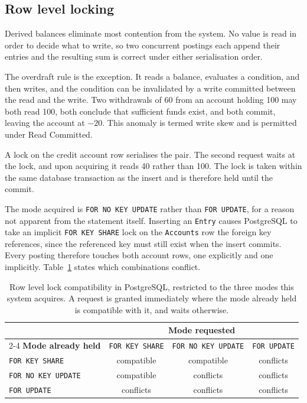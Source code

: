 \documentclass[11pt,a4paper]{article}
\newcommand{\code}[1]{\texttt{\fontsize{8.6}{10}\selectfont #1}}
\begin{document}
\subsection{Row level locking}\label{sec:lock}

Derived balances eliminate most contention from the system. No value is read in
order to decide what to write, so two concurrent postings each append their
entries and the resulting sum is correct under either serialisation order.

The overdraft rule is the exception. It reads a balance, evaluates a condition,
and then writes, and the condition can be invalidated by a write committed
between the read and the write. Two withdrawals of 60 from an account holding
100 may both read 100, both conclude that sufficient funds exist, and both
commit, leaving the account at $-20$. This anomaly is termed write skew and is
permitted under Read Committed.

A lock on the credit account row serialises the pair. The second request waits
at the lock, and upon acquiring it reads 40 rather than 100. The lock is taken
within the same database transaction as the insert and is therefore held until
the commit.

The mode acquired is \code{FOR NO KEY UPDATE} rather than \code{FOR UPDATE}, for
a reason not apparent from the statement itself. Inserting an \code{Entry}
causes PostgreSQL to take an implicit \code{FOR KEY SHARE} lock on the
\code{Accounts} row the foreign key references, since the referenced key must
still exist when the insert commits. Every posting therefore touches both account
rows, one explicitly and one implicitly. Table~\ref{tab:locks} states which combinations conflict.

\begin{table}[H]
\caption{Row level lock compatibility in PostgreSQL, restricted to the three
modes this system acquires. A request is granted immediately where the mode
already held is compatible with it, and waits otherwise.}
\label{tab:locks}
\centering
\begin{tabular}{@{}lccc@{}}
\toprule
& \multicolumn{3}{c}{\textbf{\sffamily\small Mode requested}}\\
\cmidrule(l){2-4}
\textbf{\sffamily\small Mode already held} & \code{FOR KEY SHARE} &
  \code{FOR NO KEY UPDATE} & \code{FOR UPDATE}\\
\midrule
\code{FOR KEY SHARE}     & compatible & compatible & conflicts\\
\code{FOR NO KEY UPDATE} & compatible & conflicts  & conflicts\\
\code{FOR UPDATE}        & conflicts  & conflicts  & conflicts\\
\bottomrule
\end{tabular}
\end{table}
\end{document}
